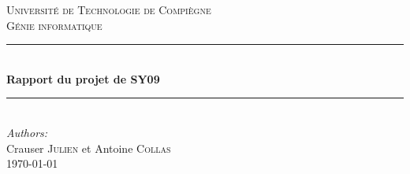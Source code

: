 \documentclass[a4paper,11pt,oneside,roman]{article}
\begin{document}
    
    \begin{titlepage}
    
        \newcommand{\HRule}{\rule{\linewidth}{0.5mm}} %
        
        \center %
         
        
        \textsc{\LARGE Université de Technologie de Compiègne}\\[0.5cm] %
        \textsc{\Large Génie informatique}\\[1.5cm] %
        
        
        \HRule \\[0.4cm]
        { \huge \bfseries Rapport du projet de SY09}\\[0.4cm] %
        \HRule \\[1.5cm]
         
        
        \Large \emph{Authors:}\\
        Crauser \textsc{Julien} et Antoine \textsc{Collas}\\[3cm] %
        
        
        {\large \AdvanceDate[-4]\today}\\[4cm] %
        

\end{titlepage}
\end{document}
